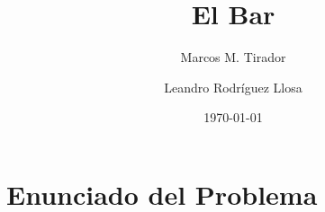 \documentclass[10pt]{amsart}
\theoremstyle{definition}
\numberwithin{equation}{section}
\begin{document}
	
	\mbox{}
	\title{El Bar}
	
	\author{Marcos M. Tirador}
	\address{Facultad de Matem\'atica y Computaci\'on \\ Universidad de La Habana \\ Ciudad de La Habana \\ Cuba}
	
	
	\author{Leandro Rodr\'iguez Llosa}
	\address{Facultad de Matem\'atica y Computaci\'on \\ Universidad de La Habana \\ Ciudad de La Habana \\ Cuba}
		

\date{\today}


\bigskip
\maketitle


\bigskip

\section{Enunciado del Problema}
	
\end{document}
